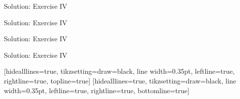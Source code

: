 \begin{frame}{Solution: Exercise IV}
    \begin{listing}[H]
        \caption{Solution for Exercise IV (\texttt{printWiFiStatus()}).}
        \label{lst:arduino:exercise:4:solution:part:2}
    \end{listing}
\end{frame}

\begin{frame}{Solution: Exercise IV}
    \begin{listing}[H]
        \caption{Solution for Exercise IV (\texttt{loop()}).}
        \label{lst:arduino:exercise:4:solution:part:3}
    \end{listing}
\end{frame}

\begin{frame}{Solution: Exercise IV}
    \begin{listing}[H]
        \caption{Example output of solution for Exercise IV.}
        \label{lst:arduino:exercise:4:solution:output:part:1}
    \end{listing}
\end{frame}

\begin{frame}{Solution: Exercise IV}
    \begin{listing}[H]
        [hidealllines=true, tikzsetting={draw=black, line width=0.35pt}, leftline=true, rightline=true, topline=true]
        \vspace{-1.25em}
        [hidealllines=true, tikzsetting={draw=black, line width=0.35pt}, leftline=true, rightline=true, bottomline=true]
        \caption{Example output of solution for Exercise IV.}
        \label{lst:arduino:exercise:4:solution:output:part:2}
    \end{listing}
\end{frame}